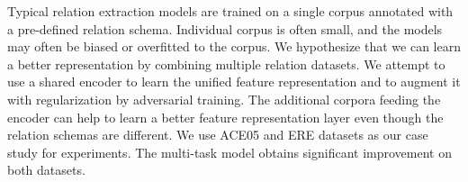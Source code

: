Typical relation extraction models are trained on a single corpus annotated with a pre-defined relation schema. Individual corpus is often small, and the models may often be biased or overfitted to the corpus. We hypothesize that we can learn a better representation by combining multiple relation datasets. We attempt to use a shared encoder to learn the unified feature representation and to augment it with regularization by adversarial training. The additional corpora feeding the encoder can help to learn a better feature representation layer even though the relation schemas are different. We use ACE05 and ERE datasets as our case study for experiments. The multi-task model obtains significant improvement on both datasets.
